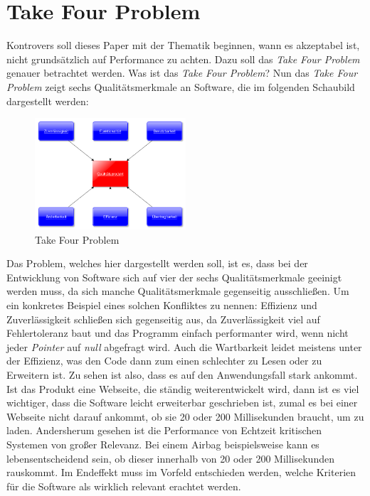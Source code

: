\section{Take Four Problem}\label{sec:takeforproblem}
Kontrovers soll dieses Paper mit der Thematik beginnen, wann es akzeptabel ist, nicht
grundsätzlich auf Performance zu achten. Dazu soll das \emph{Take Four Problem} genauer
betrachtet werden. Was ist das \emph{Take Four Problem}? Nun das \emph{Take Four Problem} zeigt
sechs Qualitätsmerkmale an Software, die im folgenden Schaubild dargestellt werden:

\begin{figure}[h]
    \centering
    \includegraphics[width=0.5\textwidth]{bilder/ISO2}
    \caption[T4P]{Take Four Problem}
    \label{img:T4P}
\end{figure}

Das Problem, welches hier dargestellt werden soll, ist es, dass bei der Entwicklung von Software
sich auf vier der sechs Qualitätsmerkmale geeinigt werden muss, da sich manche Qualitätsmerkmale
gegenseitig ausschließen. Um ein konkretes Beispiel eines solchen Konfliktes zu nennen: Effizienz
und Zuverlässigkeit schließen sich gegenseitig aus, da Zuverlässigkeit viel auf Fehlertoleranz
baut und das Programm einfach performanter wird, wenn nicht jeder \emph{Pointer} auf \emph{null}
abgefragt wird. Auch die Wartbarkeit leidet meistens unter der Effizienz, was den Code dann zum
einen schlechter zu Lesen oder zu Erweitern ist.
\newline
\newline
Zu sehen ist also, dass es auf den Anwendungsfall stark ankommt. Ist das Produkt eine Webseite,
die ständig weiterentwickelt wird, dann ist es viel wichtiger, dass die Software leicht
erweiterbar geschrieben ist, zumal es bei einer Webseite nicht darauf ankommt, ob sie 20 oder 200
Millisekunden braucht, um zu laden.
\newline
\newline
Andersherum gesehen ist die Performance von Echtzeit kritischen Systemen von großer Relevanz. Bei
einem Airbag beispielsweise kann es lebensentscheidend sein, ob dieser innerhalb von 20 oder 200
Millisekunden rauskommt. Im Endeffekt muss im Vorfeld entschieden werden, welche Kriterien für
die Software als wirklich relevant erachtet werden.
